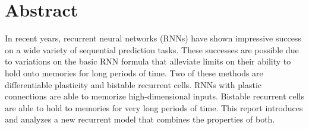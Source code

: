 \section*{\centering Abstract}

In recent years, recurrent neural networks (RNNs) have shown impressive success on a wide variety of sequential prediction tasks. These successes are possible due to variations on the basic RNN formula that alleviate limits on their ability to hold onto memories for long periods of time. Two of these methods are differentiable plasticity and bistable recurrent cells. RNNs with plastic connections are able to memorize high-dimensional inputs. Bistable recurrent cells are able to hold to memories for very long periods of time. This report introduces and analyzes a new recurrent model that combines the properties of both.